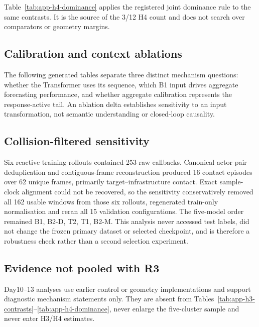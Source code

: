 



Table~\ref{tab:app-h4-dominance} applies the registered joint dominance rule to
the same contrasts. It is the source of the 3/12 H4 count and does not search
over comparators or geometry margins.



\subsection{Calibration and context ablations}

The following generated tables separate three distinct mechanism questions:
whether the Transformer uses its sequence, which B1 input drives aggregate
forecasting performance, and whether aggregate calibration represents the
response-active tail. An ablation delta establishes sensitivity to an input
transformation, not semantic understanding or closed-loop causality.



\subsection{Collision-filtered sensitivity}

Six reactive training rollouts contained 253 raw callbacks. Canonical actor-pair
deduplication and contiguous-frame reconstruction produced 16 contact episodes
over 62 unique frames, primarily target--infrastructure contact. Exact sample-
clock alignment could not be recovered, so the sensitivity conservatively
removed all 162 usable windows from those six rollouts, regenerated train-only
normalisation and reran all 15 validation configurations. The five-model order
remained B1, B2-D, T2, T1, B2-M. This analysis never accessed test labels,
did not change the frozen primary dataset or selected checkpoint, and is
therefore a robustness check rather than a second selection experiment.

\subsection{Evidence not pooled with R3}

Day10--13 analyses use earlier control or geometry implementations and support
diagnostic mechanism statements only. They are absent from
Tables~\ref{tab:app-h3-contrasts}--\ref{tab:app-h4-dominance}, never enlarge
the five-cluster sample and never enter H3/H4 estimates.

\clearpage
